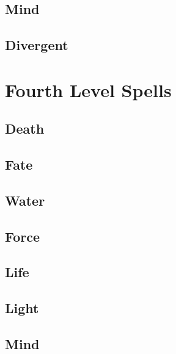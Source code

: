 \begin{multicols}{2}

\subsection{Mind}


\subsection{Divergent}


\end{multicols}

\section{Fourth Level Spells}

\begin{multicols}{2}

\subsection{Death}


\subsection{Fate}


\subsection{Water}


\subsection{Force}


\subsection{Life}


\subsection{Light}


\subsection{Mind}


\end{multicols}
